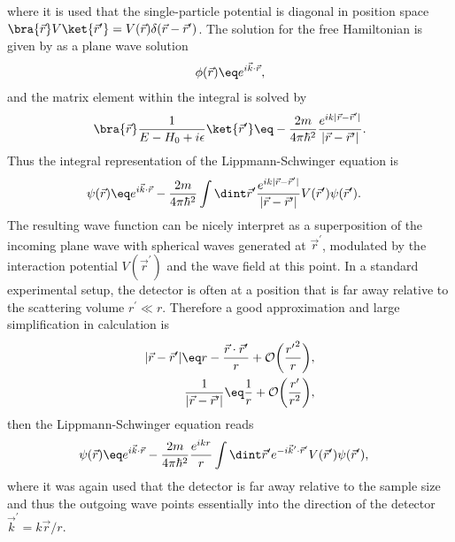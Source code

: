 \documentclass[\main/dresen_thesis.tex]{subfiles}
\begin{document}
where it is used that the single-particle potential is diagonal in position space $\bra{\vec{r}} V \ket{\vec{r}^\prime} = V(\vec{r}) \delta(\vec{r} - \vec{r}^\prime)$. 
The solution for the free Hamiltonian is given by as a plane wave solution
\begin{align}
  \phi(\vec{r}) \eq e^{i\vec{k} \cdot \vec{r}},
\end{align}
and the matrix element within the integral is solved by
\begin{align}
  \bra{\vec{r}}\frac{1}{E - H_0 + i \epsilon} \ket{\vec{r}^\prime} \eq -\frac{2m}{4 \pi \hbar^2} \frac{e^{ik|\vec{r} - \vec{r}^\prime|}}{|\vec{r} - \vec{r}^\prime|}.
\end{align}
Thus the integral representation of the Lippmann-Schwinger equation is
\begin{align}
  \psi (\vec{r}) &\eq e^{i\vec{k} \cdot \vec{r}} - \frac{2m}{4 \pi\hbar^2} \int \dint \vec{r}^\prime \frac{e^{ik|\vec{r} - \vec{r}^\prime|}}{|\vec{r} - \vec{r}^\prime|} V (\vec{r}^\prime)\psi (\vec{r}^\prime).
\end{align}
The resulting wave function can be nicely interpret as a superposition of the incoming plane wave with spherical waves generated at $\vec{r}^\prime$, modulated by the interaction potential $V(\vec{r}^\prime)$ and the wave field at this point.
In a standard experimental setup, the detector is often at a position that is far away relative to the scattering volume $r^\prime \ll r$. 
Therefore a good approximation and large simplification in calculation is
\begin{align}
  |\vec{r} - \vec{r}^\prime| \eq r - \frac{\vec{r} \cdot \vec{r}^\prime}{r} + \mathcal{O}\bigg(\frac{{r^\prime}^2}{r}\bigg),\\
  \frac{1}{|\vec{r} - \vec{r}^\prime|} \eq \frac{1}{r} + \mathcal{O}\bigg(\frac{r^\prime}{r^2} \bigg),
\end{align}
then the Lippmann-Schwinger equation reads
\begin{align}
  \psi (\vec{r}) &\eq e^{i\vec{k} \cdot \vec{r}} - \frac{2m}{4 \pi\hbar^2} \frac{e^{ikr}}{r} \int \dint \vec{r}^\prime e^{-i\vec{k}^\prime \cdot \vec{r}^\prime} V (\vec{r}^\prime)\psi (\vec{r}^\prime),
\end{align}
where it was again used that the detector is far away relative to the sample size and thus the outgoing wave points essentially into the direction of the detector  $\vec{k}^\prime = k \vec{r} / r$.
\end{document}
